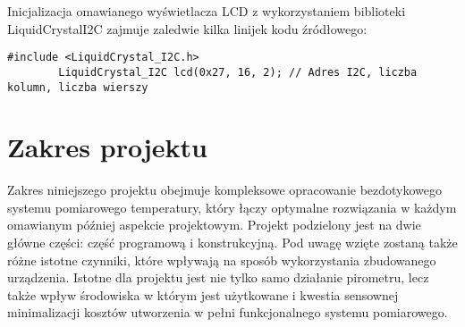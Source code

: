     \vspace{12pt}
    
    Inicjalizacja omawianego wyświetlacza LCD z wykorzystaniem biblioteki LiquidCrystalI2C zajmuje zaledwie kilka linijek kodu źródłowego:

    \begin{lstlisting}[style=mystyle]
        #include <LiquidCrystal_I2C.h>
        LiquidCrystal_I2C lcd(0x27, 16, 2); // Adres I2C, liczba kolumn, liczba wierszy
        \end{lstlisting}
    
    \section{Zakres projektu}
    Zakres niniejszego projektu obejmuje kompleksowe opracowanie bezdotykowego systemu pomiarowego temperatury, który łączy optymalne rozwiązania w każdym omawianym później aspekcie projektowym. Projekt podzielony jest na dwie główne części: część programową i konstrukcyjną. Pod uwagę wzięte zostaną także różne istotne czynniki, które wpływają na sposób wykorzystania zbudowanego urządzenia. Istotne dla projektu jest nie tylko samo działanie pirometru, lecz także wpływ środowiska w którym jest użytkowane i kwestia sensownej minimalizacji kosztów utworzenia w pełni funkcjonalnego systemu pomiarowego.